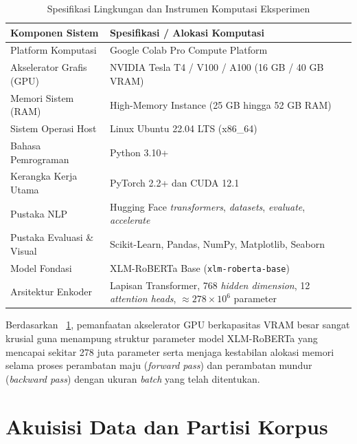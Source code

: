 \begin{table}[H]
    \centering
    \small
    \renewcommand{\arraystretch}{1.08}
    \begin{tabularx}{\textwidth}{|>{\raggedright\arraybackslash}p{4.2cm}|>{\raggedright\arraybackslash}X|}
        \hline
        \rowcolor[gray]{0.85}
        \textbf{Komponen Sistem} & \textbf{Spesifikasi / Alokasi Komputasi} \\
        \hline
        Platform Komputasi & Google Colab Pro Compute Platform \\
        \hline
        Akselerator Grafis (GPU) & NVIDIA Tesla T4 / V100 / A100 (16 GB / 40 GB VRAM) \\
        \hline
        Memori Sistem (RAM) & High-Memory Instance (25 GB hingga 52 GB RAM) \\
        \hline
        Sistem Operasi Host & Linux Ubuntu 22.04 LTS (x86\_64) \\
        \hline
        Bahasa Pemrograman & Python 3.10+ \\
        \hline
        Kerangka Kerja Utama & PyTorch 2.2+ dan CUDA 12.1 \\
        \hline
        Pustaka NLP & Hugging Face \textit{transformers}, \textit{datasets}, \textit{evaluate}, \textit{accelerate} \\
        \hline
        Pustaka Evaluasi \& Visual & Scikit-Learn, Pandas, NumPy, Matplotlib, Seaborn \\
        \hline
        Model Fondasi & XLM-RoBERTa Base (\texttt{xlm-roberta-base}) \\
        \hline
        Arsitektur Enkoder & 12 Lapisan Transformer, 768 \textit{hidden dimension}, 12 \textit{attention heads}, $\approx 278 \times 10^6$ parameter \\
        \hline
    \end{tabularx}
    \caption{Spesifikasi Lingkungan dan Instrumen Komputasi Eksperimen}
    \label{tab:lingkungan_komputasi}
\end{table}

Berdasarkan \tablename~\ref{tab:lingkungan_komputasi}, pemanfaatan akselerator GPU berkapasitas VRAM besar sangat krusial guna menampung struktur parameter model XLM-RoBERTa yang mencapai sekitar 278 juta parameter serta menjaga kestabilan alokasi memori selama proses perambatan maju (\textit{forward pass}) dan perambatan mundur (\textit{backward pass}) dengan ukuran \textit{batch} yang telah ditentukan.

\section{Akuisisi Data dan Partisi Korpus}

